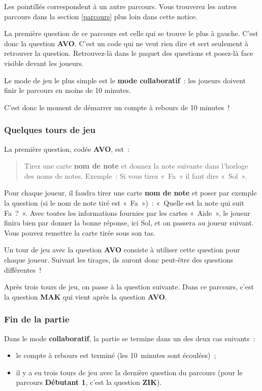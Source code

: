 \documentclass[11pt]{article}
\newcommand{\carte}[1]
{\textbf{#1}}
\newcommand{\parcours}[1]
{\textbf{#1}}
\newcommand{\QST}[1]
{\textbf{#1}}
\newcommand{\mode}[1]
{\textbf{#1}}
\begin{document}
Les pointillés correspondent à un autre parcours. Vous trouverez les autres
parcours dans la section \ref{parcours} plus loin dans cette notice.

La première question de ce parcours est celle qui se trouve le plus à gauche.
C’est donc la question \QST{AVO}. C’est un code qui ne veut rien dire et sert
seulement à retrouver la question. Retrouvez-là dans le paquet des questions
et posez-là face visible devant les joueurs.

Le mode de jeu le plus simple est le \mode{mode collaboratif} : les joueurs
doivent finir le parcours en moins de 10 minutes.

C’est donc le moment de démarrer un compte à rebours de 10 minutes !

\subsubsection{Quelques tours de jeu}

La première question, codée \QST{AVO}, est :

\begin{quote}
Tirez une carte \carte{nom de note} et donnez la note suivante dans l’horloge
des noms de notes. Exemple : Si vous tirez « Fa » il faut dire « Sol ».
\end{quote}

Pour chaque joueur, il faudra tirer une carte \carte{nom de note} et poser par
exemple la question (si le nom de note tiré est « Fa ») : « Quelle est la note
qui suit Fa ? ». Avec toutes les informations fournies par les cartes
« Aide », le joueur finira bien par donner la bonne réponse, ici Sol, et on
passera au joueur suivant. Vous pouvez remettre la carte tirée sous son tas.

Un tour de jeu avec la question \QST{AVO} consiste à utiliser cette question
pour chaque joueur. Suivant les tirages, ils auront donc peut-être des
questions différentes !

Après trois tours de jeu, on passe à la question suivante. Dans ce parcours,
c’est la question \QST{MAK} qui vient après la question \QST{AVO}.

\subsubsection{Fin de la partie}

Dans le mode \mode{collaboratif}, la partie se termine dans un des deux cas
suivants :

\begin{itemize}
    \item le compte à rebours est terminé (les 10 minutes sont écoulées) ;
    \item il y a eu trois tours de jeu avec la dernière question du parcours
        (pour le parcours \parcours{Débutant 1}, c’est la question \QST{ZIK}).
\end{itemize}
\end{document}
